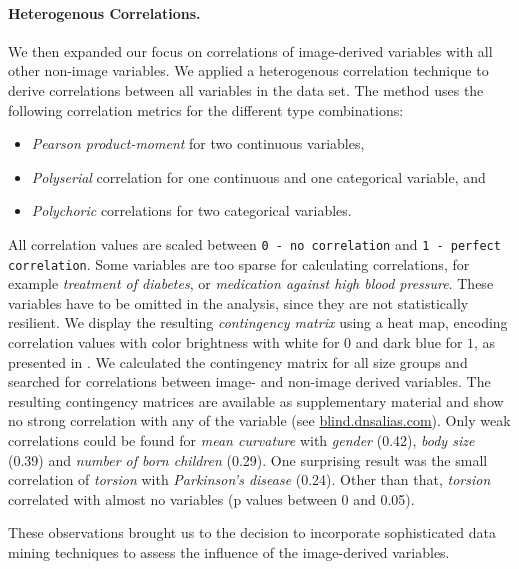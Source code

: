 \documentclass[a4paper,twoside]{style/article}
\begin{document}
\paragraph{Heterogenous Correlations.}
We then expanded our focus on correlations of image-derived variables with all other non-image variables.
We applied a heterogenous correlation technique to derive correlations between all variables in the data set.
The method uses the following correlation metrics for the different type combinations:
\begin{itemize}
\item \emph{Pearson product-moment} for two continuous variables, 
\item \emph{Polyserial} correlation for one continuous and one categorical variable, and
\item \emph{Polychoric} correlations for two categorical variables.
\end{itemize}
All correlation values are scaled between \texttt{0 - no correlation} and \texttt{1 - perfect correlation}.
Some variables are too sparse for calculating correlations, for example \emph{treatment of diabetes}, or \emph{medication against high blood pressure}.
These variables have to be omitted in the analysis, since they are not statistically resilient.
We display the resulting \emph{contingency matrix} using a heat map, encoding correlation values with color brightness with white for $0$ and dark blue for $1$, as presented in \cite{Klemm2014VIS}.
We calculated the contingency matrix for all size groups and searched for correlations between image- and non-image derived variables.
The resulting contingency matrices are available as supplementary material and show no strong correlation with any of the variable (see \url{blind.dnsalias.com}).
Only weak correlations could be found for \emph{mean curvature} with \emph{gender} (0.42), \emph{body size} (0.39) and \emph{number of born children} (0.29).
One surprising result was the small correlation of \emph{torsion} with \emph{Parkinson's disease} (0.24).
Other than that, \emph{torsion} correlated with almost no variables (p values between 0 and 0.05).

These observations brought us to the decision to incorporate sophisticated data mining techniques to assess the influence of the image-derived variables.
\end{document}
